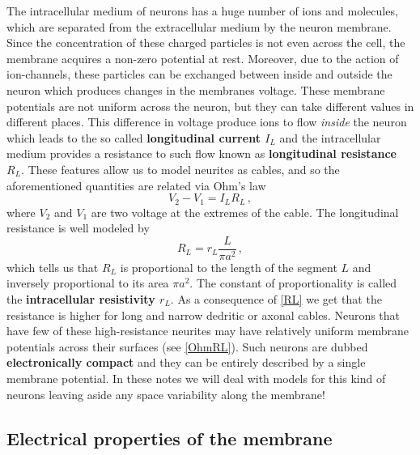 \documentclass[titlepage]{article}
\begin{document}
The intracellular medium of neurons has a huge number of ions and molecules, which are separated from the extracellular medium by the neuron membrane. Since the concentration of these charged particles is not even across the cell, the membrane acquires a non-zero potential at rest. Moreover, due to the action of ion-channels, these particles can be exchanged between inside and outside the neuron which produces changes in the membranes voltage. These membrane potentials are not uniform across the neuron, but they can take different values in different places. This difference in voltage produce ions to flow \textit{inside} the neuron which leads to the so called \textbf{longitudinal current $I_L$} and the intracellular medium provides a resistance to such flow known as \textbf{longitudinal resistance $R_L$}. These features allow us to model neurites as cables, and so the aforementioned quantities are related via Ohm's law
\begin{equation}\label{OhmRL}
V_2 - V_1 = I_L R_L\,,
\end{equation}
where $V_2$ and $V_1$ are two voltage at the extremes of the cable. The longitudinal resistance is well modeled by
\begin{equation}\label{RL}
R_L = r_L \frac{L}{\pi a^2}\,,
\end{equation}
which tells us that $R_L$ is proportional to the length of the segment $L$ and inversely proportional to its area $\pi a^2$. The constant of proportionality is called the \textbf{intracellular resistivity $r_L$}. As a consequence of \eqref{RL} we get that the resistance is higher for long and narrow dedritic or axonal cables. Neurons that have few of these high-resistance neurites may have relatively uniform membrane potentials across their surfaces (see \eqref{OhmRL}). Such neurons are dubbed \textbf{electronically compact} and they can be entirely described by a single membrane potential. In these notes we will deal with models for this kind of neurons leaving aside any space variability along the membrane!

\subsection{Electrical properties of the membrane}
\end{document}
